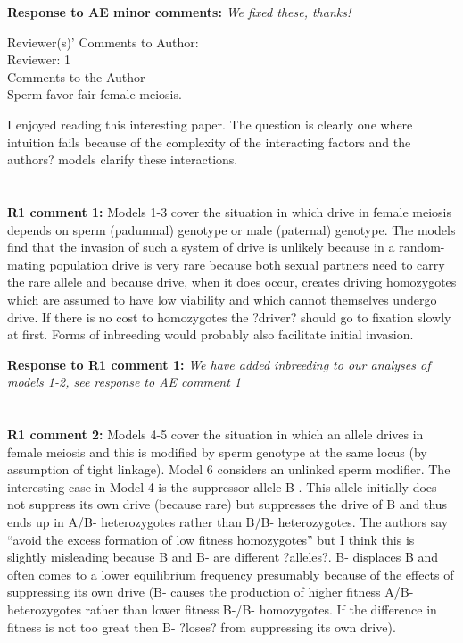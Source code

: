 \documentclass[12pt,letterpaper]{article}
\begin{document}
{\bf{Response to AE minor comments:}} \emph{We fixed these, thanks!}

\newpage
Reviewer(s)' Comments to Author:
\\
Reviewer: 1
\\
Comments to the Author
\\Sperm favor fair female meiosis.

I enjoyed reading this interesting paper. The question is clearly one where intuition fails because of the complexity of the interacting factors and the authors? models clarify these interactions.
\\
\\
\\
{\bf{R1 comment 1:}}
Models 1-3 cover the situation in which drive in female meiosis depends on sperm (padumnal) genotype or male (paternal) genotype. The models find that the invasion of such a system of drive is unlikely because in a random-mating population drive is very rare because both sexual partners need to carry the rare allele and because drive, when it does occur, creates driving homozygotes which are assumed to have low viability and which cannot themselves undergo drive. If there is no cost to homozygotes the ?driver? should go to fixation slowly at first. Forms of inbreeding would probably also facilitate initial invasion.

{\bf{Response to R1 comment 1:}} \emph{We have added inbreeding to our analyses of models 1-2, see response to AE comment 1}
\\
\\
\\
{\bf{R1 comment 2:}}
Models 4-5 cover the situation in which an allele drives in female meiosis and this is modified by sperm genotype at the same locus (by assumption of tight linkage). Model 6 considers an unlinked sperm modifier. The interesting case in Model 4 is the suppressor allele B-. This allele initially does not suppress its own drive (because rare) but suppresses the drive of B and thus ends up in A/B- heterozygotes rather than B/B- heterozygotes. The authors say ``avoid the excess formation of low fitness homozygotes'' but I think this is slightly misleading because B and B- are different ?alleles?. B- displaces B and often comes to a lower equilibrium frequency presumably because of the effects of suppressing its own drive
(B- causes the production of higher fitness A/B- heterozygotes rather than lower fitness B-/B- homozygotes. If the difference in fitness is not too great then B- ?loses? from suppressing its own drive).
\end{document}
